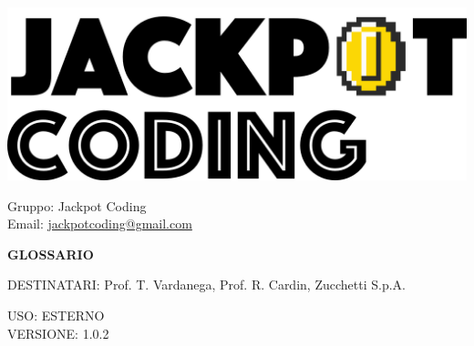 \documentclass[5pt]{article}
\begin{document}
\begin{minipage}[t]{0.50\textwidth}
    \begin{flushleft}
        \hspace{10pt}
        \includegraphics[scale=0.65]{jackpot-logo.png} 
    \end{flushleft}
\end{minipage}
\hspace{-60pt} %
\begin{flushright}
    \begin{minipage}[t]{0.50\textwidth}
        \begin{flushright}
            Gruppo: {\Large Jackpot Coding}\\
            Email: \href{mailto:jackpotcoding@gmail.com}{jackpotcoding@gmail.com}
        \end{flushright}
    \end{minipage}
\end{flushright}

\vspace{24pt}

\begin{center}
    \textbf{\LARGE GLOSSARIO}
\end{center}

\vspace{13pt}

\begin{flushleft}
    \begin{spacing}{1.5}
        DESTINATARI: Prof. T. Vardanega, Prof. R. Cardin, Zucchetti S.p.A.\\%
    \end{spacing}
\end{flushleft}

\begin{flushright}
    \begin{spacing}{1}
        USO: ESTERNO\\
        VERSIONE: 1.0.2\\
    \end{spacing}
\end{flushright}
\end{document}
